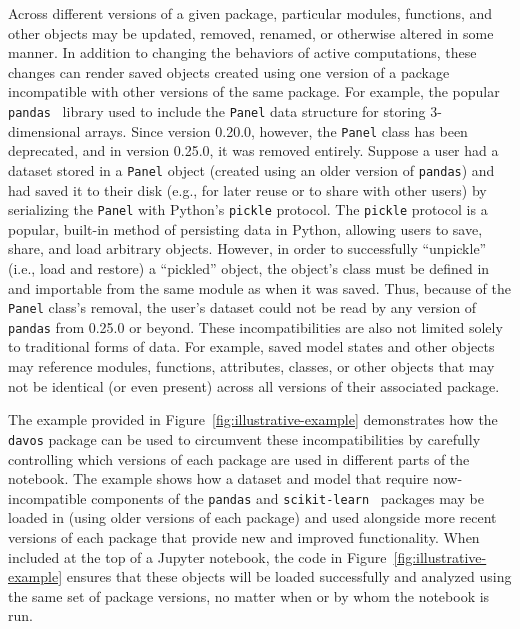 \documentclass[preprint,12pt,a4paper]{elsarticle}
\begin{document}
Across different versions of a given package, particular modules, functions, and other objects
may be updated, removed, renamed, or otherwise altered in some manner.  In addition to changing the
behaviors of active computations, these changes can render saved objects created using one
version of a package incompatible with other versions of the
same package.  For example, the popular \texttt{pandas}~\cite{McKi10}
library used to include the \texttt{Panel} data structure for storing 3-dimensional arrays.
Since version 0.20.0, however, the \texttt{Panel} class has been deprecated, and in
version 0.25.0, it was removed entirely. Suppose a user had a dataset stored in a \texttt{Panel} object
(created using an older version of \texttt{pandas}) and had saved it to their disk (e.g., for later reuse
or to share with other users) by serializing the \texttt{Panel} with Python's \texttt{pickle} protocol.
The \texttt{pickle} protocol is a popular, built-in method of persisting data in Python, allowing users to save, share, and load arbitrary objects.
However, in order to successfully ``unpickle'' (i.e., load and restore) a ``pickled'' object, the object's class must be defined in and importable from the same module as when it was saved.
Thus, because of the \texttt{Panel} class's removal, the user's dataset could not be read by any version of \texttt{pandas} from 0.25.0 or beyond. These
incompatibilities are also not limited solely to traditional forms of data.
For example, saved model states and other objects may reference
modules, functions, attributes, classes, or other objects that may not be identical (or even present)
across all versions of their associated package.

The example provided in Figure~\ref{fig:illustrative-example}
demonstrates how the \texttt{davos} package can be used to circumvent
these incompatibilities by carefully controlling which versions of
each package are used in different parts of the notebook.  The example
shows how a dataset and model that require now-incompatible components of
the \texttt{pandas} and \texttt{scikit-learn}~\cite{PedrEtal11}
packages may be loaded in (using older versions of each package) and used
alongside more recent versions of each package that provide new and improved functionality.
When included at the top of a Jupyter notebook, the code in Figure~\ref{fig:illustrative-example}
ensures that these objects will be loaded successfully and analyzed using the same set
of package versions, no matter when or by whom the notebook is run.
\end{document}
